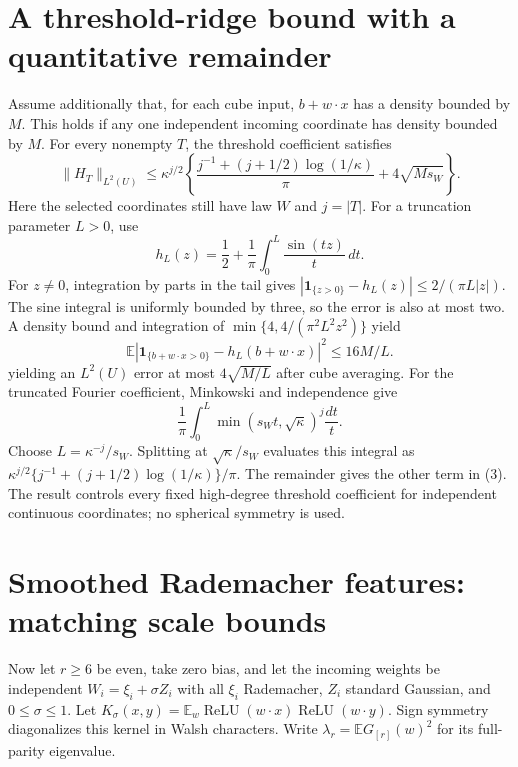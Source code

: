\documentclass[11pt]{article}
\newcommand{\E}{\mathbb E}\newcommand{\R}{\mathbb R}
\newcommand{\relu}{\operatorname{ReLU}}
\begin{document}
\section{A threshold-ridge bound with a quantitative remainder}
Assume additionally that, for each cube input, $b+w\cdot x$ has
a density bounded by $M$. This holds if any one independent incoming
coordinate has density bounded by $M$.
For every nonempty $T$, the threshold coefficient satisfies
\[
 \boxed{\quad
 \|H_T\|_{L^2(U)}\le\kappa^{j/2}
 \left\{\frac{j^{-1}+(j+1/2)\log(1/\kappa)}{\pi}
                              +4\sqrt{M s_W}\right\}.
 \quad}                                               \tag{3}
\]
Here the selected coordinates still have law $W$ and $j=|T|$.
For a truncation parameter $L>0$, use
\[
 h_L(z)=\frac12+\frac1\pi\int_0^L\frac{\sin(tz)}t\,dt.
\]
For $z\ne0$, integration by parts in the tail gives
$|\mathbf1_{\{z>0\}}-h_L(z)|\le2/(\pi L|z|)$.
The sine integral is uniformly bounded by three, so the error is also
at most two. A density bound and integration of
$\min\{4,4/(\pi^2L^2z^2)\}$ yield
\[
 \E|\mathbf1_{\{b+w\cdot x>0\}}-h_L(b+w\cdot x)|^2
                                    \le16M/L.
\]
yielding an $L^2(U)$ error at most $4\sqrt{M/L}$ after cube averaging.
For the truncated Fourier coefficient, Minkowski and independence give
\[
 \frac1\pi\int_0^L\min(s_Wt,\sqrt\kappa)^j\frac{dt}{t}.
\]
Choose $L=\kappa^{-j}/s_W$. Splitting at
$\sqrt\kappa/s_W$ evaluates this integral as
$\kappa^{j/2}\{j^{-1}+(j+1/2)\log(1/\kappa)\}/\pi$.
The remainder gives the other term in (3).
The result controls every fixed high-degree threshold coefficient for
independent continuous coordinates; no spherical symmetry is used.

\section{Smoothed Rademacher features: matching scale bounds}
Now let $r\ge6$ be even, take zero bias, and let the incoming weights be
independent $W_i=\xi_i+\sigma Z_i$ with all $\xi_i$ Rademacher,
$Z_i$ standard Gaussian, and $0\le\sigma\le1$.
Let $K_\sigma(x,y)=\E_w\relu(w\cdot x)\relu(w\cdot y)$.
Sign symmetry diagonalizes this kernel in Walsh characters. Write
$\lambda_r=\E G_{[r]}(w)^2$ for its full-parity eigenvalue.
\end{document}
